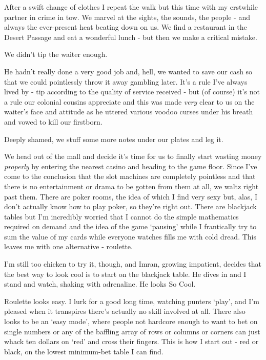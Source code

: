 \documentclass[a5paper,titlepage,11pt,draft]{book}
\begin{document}
After a swift change of clothes I repeat the walk but this time with my erstwhile partner in crime in tow.  We marvel at the sights, the sounds, the people - and always the ever-present heat beating down on us.  We find a restaurant in the Desert Passage and eat a wonderful lunch - but then we make a critical mistake.

We didn't tip the waiter enough.

He hadn't really done a very good job and, hell, we wanted to save our cash so that we could pointlessly throw it away gambling later.  It's a rule I've always lived by - tip according to the quality of service received - but (of course) it's not a rule our colonial cousins appreciate and this was made \emph{very} clear to us on the waiter's face and attitude as he uttered various voodoo curses under his breath and vowed to kill our firstborn.

Deeply shamed, we stuff some more notes under our plates and leg it.

We head out of the mall and decide it's time for us to finally start wasting money \emph{properly} by entering the nearest casino and heading to the game floor.  Since I've come to the conclusion that the slot machines are completely pointless and that there is no entertainment or drama to be gotten from them at all, we waltz right past them.  There are poker rooms, the idea of which I find very sexy but, alas, I don't actually know how to play poker, so they're right out.  There are blackjack tables but I'm incredibly worried that I cannot do the simple mathematics required on demand and the idea of the game `pausing' while I frantically try to sum the value of my cards while everyone watches fills me with cold dread.  This leaves me with one alternative - roulette. 

I'm still too chicken to try it, though, and Imran, growing impatient, decides that the best way to look cool is to start on the blackjack table.  He dives in and I stand and watch, shaking with adrenaline.  He looks So Cool.

Roulette looks easy.  I lurk for a good long time, watching punters `play', and I'm pleased when it transpires there's actually no skill involved at all.  There also looks to be an `easy mode', where people not hardcore enough to want to bet on single numbers or any of the baffling array of rows or columns or corners can just whack ten dollars on `red' and cross their fingers.  This is how I start out - red or black, on the lowest minimum-bet table I can find.
\end{document}
